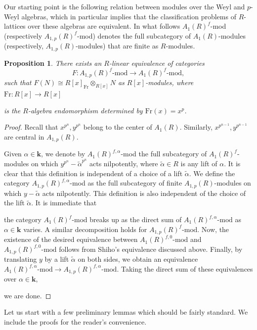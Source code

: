 \documentclass[12pt,letterpaper]{amsart}
\theoremstyle{plain}
\newtheorem{prop}{Proposition}[section]
\theoremstyle{definition}
\begin{document}
Our starting point is the following relation between modules over the Weyl and $p$-Weyl algebras, which in particular implies that the classification problems of $R$-lattices over these algebras are equivalent. In what follows $A_1(R)^f$-mod (respectively $A_{1,p}(R)^f$-mod) denotes the full subcategory
of $A_1(R)$-modules (respectively, $A_{1,p}(R)$-modules) that are finite as $R$-modules.
\begin{prop}\label{Equivalence}
 There exists an $R$-linear equivalence of categories 
 $$F:A_{1,p}(R)^f\text{-mod}\to A_{1}(R)^f\text{-mod},$$ such that $F(N)\cong R[x]_{\mathrm{Fr}}\otimes_{R[x]}N$ as $R[x]$-modules, where $\mathrm{Fr}:R[x]\to R[x]$ 

 is the $R$-algebra endomorphism determined by $\mathrm{Fr}(x)=x^p$.
\end{prop}
\begin{proof}
Recall that $x^{p^n}, y^{p^n}$ belong to the center of $A_1(R)$.  Similarly, $x^{p^{n-1}}, y^{p^{n-1}}$  are central in $A_{1, p}(R)$. 

Given $\alpha\in \mathbf{k}$, we denote by $A_1(R)^{f,\alpha}$-mod the full subcategory of $A_1(R)^f$-modules
on which $y^{p^n}-\tilde{\alpha}^{p^n}$ acts nilpotently, where $\tilde{\alpha}\in R$ is any lift of $\alpha$. 
It is clear that this definition is independent of a choice of a lift $\tilde{\alpha}$. 
We define the category $A_{1,p}(R)^{f,\alpha}$-mod as the full subcategory
of finite $A_{1,p}(R)$-modules on which $y-\tilde{\alpha}$ acts nilpotently. This definition is also independent of the choice of the lift $\tilde{\alpha}$. It is immediate that

the category $A_1(R)^f\text{-mod}$ breaks up as the  direct sum of $A_1(R)^{f,\alpha}\text{-mod}$ as $\alpha\in\mathbf{k}$ varies. A similar decomposition holds for
$A_{1,p}(R)^f\text{-mod}$. Now, the existence of the desired equivalence between $A_1(R)^{f,0}\text{-mod}$ and $A_{1,p}(R)^{f,0}\text{-mod}$
follows from Shiho's equivalence discussed above. Finally, by translating $y$ by a lift $\tilde{\alpha}$ on both sides, we obtain an equivalence
$A_1(R)^{f,\alpha}\text{-mod}\to A_{1,p}(R)^{f,\alpha}\text{-mod}$. Taking the direct sum of these equivalences over $\alpha\in\mathbf{k}$, 

we are done.
\end{proof}

Let us start with a few preliminary lemmas which should be fairly standard. We include the proofs for the reader's convenience.
\end{document}
